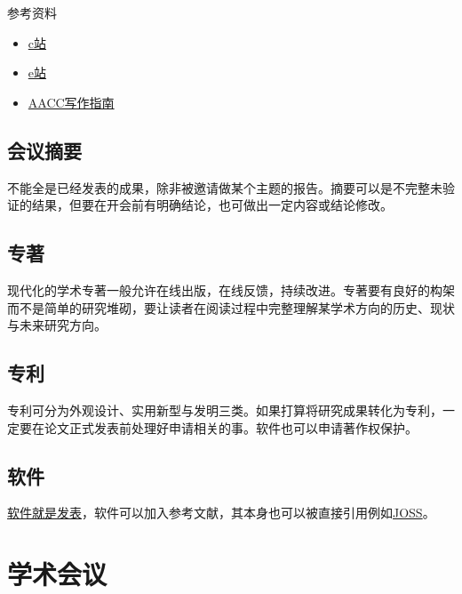 \documentclass[]{tufte-book}
\providecommand{\tightlist}{%
  \setlength{\itemsep}{0pt}\setlength{\parskip}{0pt}}
\begin{document}
参考资料

\begin{itemize}
\tightlist
\item
  \href{https://class.coursera.org/sciwrite-2012-001/class}{c站}
\item
  \href{https://class.stanford.edu/courses/Medicine/SciWrite/Fall2013/about}{e站}
\item
  \href{http://www.aacc.org/publications/clin_chem/ccgsw/Pages/default.aspx}{AACC写作指南}
\end{itemize}

\hypertarget{ux4f1aux8baeux6458ux8981}{%
\subsection{会议摘要}\label{ux4f1aux8baeux6458ux8981}}

不能全是已经发表的成果，除非被邀请做某个主题的报告。摘要可以是不完整未验证的结果，但要在开会前有明确结论，也可做出一定内容或结论修改。

\hypertarget{ux4e13ux8457}{%
\subsection{专著}\label{ux4e13ux8457}}

现代化的学术专著一般允许在线出版，在线反馈，持续改进。专著要有良好的构架而不是简单的研究堆砌，要让读者在阅读过程中完整理解某学术方向的历史、现状与未来研究方向。

\hypertarget{ux4e13ux5229}{%
\subsection{专利}\label{ux4e13ux5229}}

专利可分为外观设计、实用新型与发明三类。如果打算将研究成果转化为专利，一定要在论文正式发表前处理好申请相关的事。软件也可以申请著作权保护。

\hypertarget{ux8f6fux4ef6}{%
\subsection{软件}\label{ux8f6fux4ef6}}

\href{https://simplystatistics.org/2018/05/03/software-as-an-academic-publication/}{软件就是发表}，软件可以加入参考文献，其本身也可以被直接引用例如\href{http://joss.theoj.org/}{JOSS}。

\hypertarget{ux5b66ux672fux4f1aux8bae}{%
\section{学术会议}\label{ux5b66ux672fux4f1aux8bae}}
\end{document}
